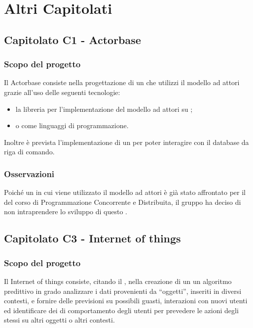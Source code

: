 \section{Altri Capitolati}

\subsection{Capitolato C1 - Actorbase}
\subsubsection{Scopo del progetto}

Il  Actorbase consiste nella progettazione di un  che utilizzi il modello ad attori grazie all'uso delle seguenti tecnologie:
\begin{itemize}
	\item la libreria  per l'implementazione del modello ad attori su ;
	\item {} o  come linguaggi di programmazione.
\end{itemize}
Inoltre è prevista l'implementazione di un  per poter interagire con il database da riga di comando.

\subsubsection{Osservazioni}
Poiché un  in cui viene utilizzato il modello ad attori è già stato affrontato per il  del corso di Programmazione Concorrente e Distribuita, il gruppo ha deciso di non intraprendere lo sviluppo di questo .


\subsection{Capitolato C3 - Internet of things}
\subsubsection{Scopo del progetto}

Il  Internet of things consiste, citando il , nella creazione di un un algoritmo predittivo in grado analizzare i dati provenienti da “oggetti”, inseriti in diversi contesti, e fornire delle previsioni su possibili guasti, interazioni con nuovi utenti ed identificare dei  di comportamento degli utenti per prevedere le azioni degli stessi su altri oggetti o altri contesti.

